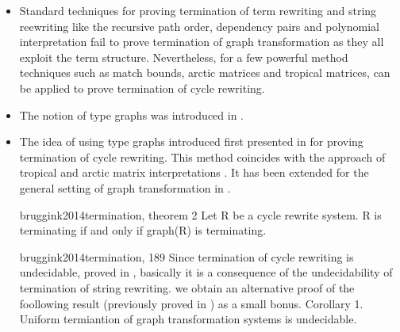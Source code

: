\begin{itemize}
    \item Standard techniques for proving termination of term rewriting and string reewriting like the recursive path order, dependency pairs and polynomial interpretation fail to prove termination of graph transformation as they all exploit the term structure. Nevertheless, for a few powerful method techniques such as match bounds, arctic matrices and tropical matrices, can be applied to prove termination of cycle rewriting.
    \item The notion of type graphs was introduced in \cite{corradini1996graph}.
    \item The idea of using type graphs introduced first presented in \cite{CRS} for proving termination of cycle rewriting. This method coincides with the approach of tropical and arctic matrix interpretations \cite{koprowski2008arctic, endrullis2008matrix}. It has been extended for the general setting of graph transformation in \cite{bruggink2014termination}.
    \item[bruggink2014termination, theorem 2]  Let R be a cycle rewrite system. R is terminating if and only if graph(R) is terminating. 
    \item[bruggink2014termination, 189] Since termination of cycle rewriting is undecidable, proved in \cite{CRS}, basically it is a consequence of the undecidability of termination of string rewriting. we obtain an alternative proof of the foollowing result (previously proved in \cite{plump1998termination}) as a small bonus. Corollary 1. Uniform termiantion of graph transformation systems is undecidable.
\end{itemize}

